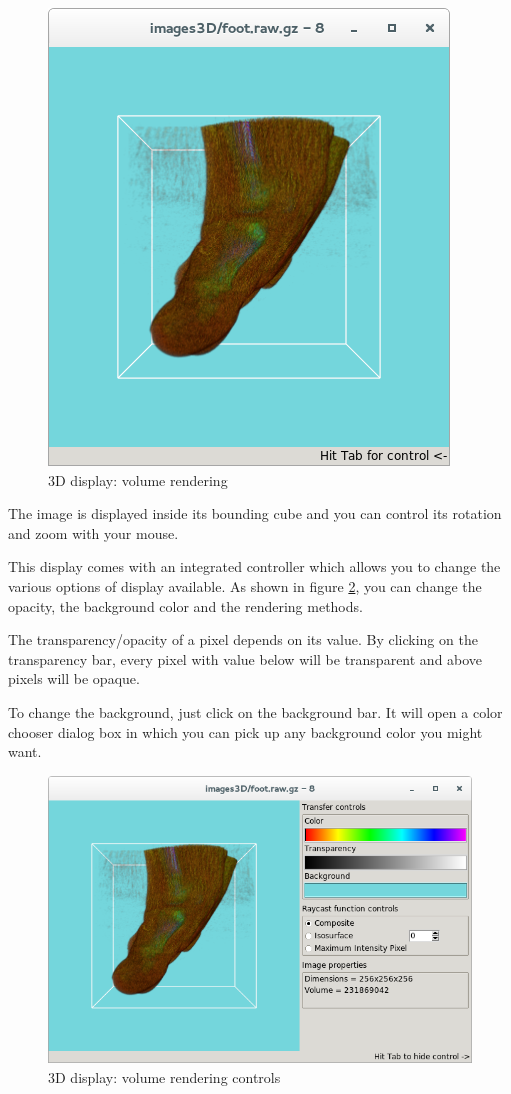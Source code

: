 \documentclass[a4paper,10pt,oneside]{article}
\begin{document}
\begin{figure}
\centering
\includegraphics[scale=0.5]{images/dis3D_volren.png}
\caption{3D display: volume rendering}
\label{fig:dis3D_volren}
\end{figure}

The image is displayed inside its bounding cube and you can control its rotation
and zoom with your mouse.

This display comes with an integrated controller which allows you to change
the various options of display available. As shown in figure \ref{fig:dis3D_volren_ctrl},
you can change the opacity, the background color and the rendering methods.

The transparency/opacity of a pixel depends on its value. By clicking on the 
transparency bar, every pixel with value below will be transparent and above
pixels will be opaque.

To change the background, just click on the background bar. It will open a
color chooser dialog box in which you can pick up any background color you
might want.

\begin{figure}
\centering
\includegraphics[scale=0.5]{images/dis3D_volren_ctrl.png}
\caption{3D display: volume rendering controls}
\label{fig:dis3D_volren_ctrl}
\end{figure}
\end{document}
